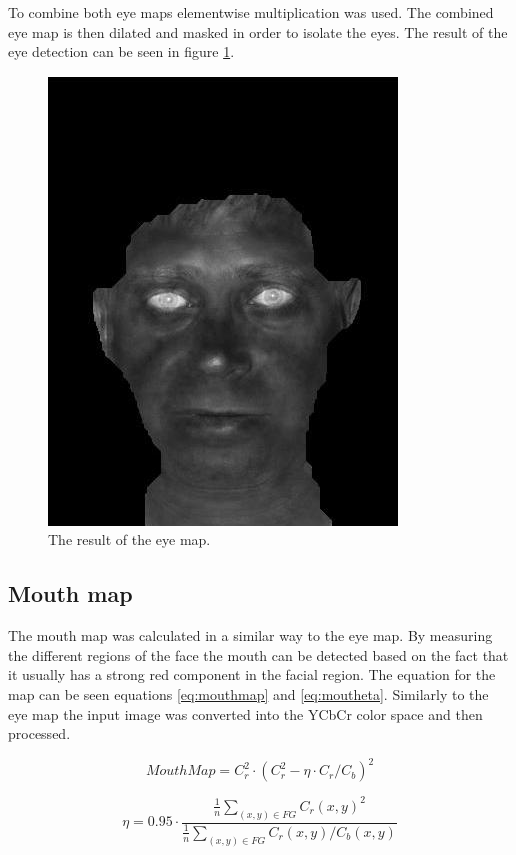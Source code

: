 To combine both eye maps elementwise multiplication was used. The combined eye
map is then dilated and masked in order to isolate the eyes. The result of the
eye detection can be seen in figure \ref{fig:eyemap}.

\begin{figure}[htbp]
  \centering
  \includegraphics[width=0.6\columnwidth]{images/eye.jpg}
  \caption{The result of the eye map.}
  \label{fig:eyemap}
\end{figure}

\subsection{Mouth map}
The mouth map was calculated in a similar way to the eye map. By measuring the
different regions of the face the mouth can be detected based on the fact that
it usually has a strong red component in the facial region. The equation for
the map can be seen equations \ref{eq:mouthmap} and \ref{eq:moutheta}.
Similarly to the eye map the input image was converted into the YCbCr color
space and then processed.

\begin{equation}
  MouthMap = C_r^2 \cdot (C_r^2 - \eta \cdot C_r/C_b)^2
  \label{eq:mouthmap}
\end{equation}

\begin{equation}
  \eta = 0.95 \cdot \frac{\frac{1}{n}\sum_{(x,y)\in FG} C_r(x,y)^2}{\frac{1}{n}\sum_{(x,y)\in FG} C_r(x,y)/C_b(x,y)}
  \label{eq:moutheta}
\end{equation}

